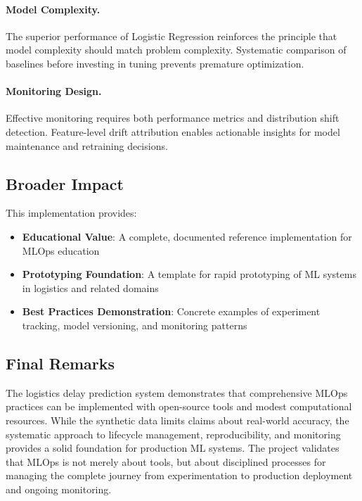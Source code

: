 \documentclass[11pt,a4paper]{article}
\begin{document}
\paragraph{Model Complexity.}
The superior performance of Logistic Regression reinforces the principle that model complexity should match problem complexity. Systematic comparison of baselines before investing in tuning prevents premature optimization.

\paragraph{Monitoring Design.}
Effective monitoring requires both performance metrics and distribution shift detection. Feature-level drift attribution enables actionable insights for model maintenance and retraining decisions.

\subsection{Broader Impact}

This implementation provides:
\begin{itemize}
    \item \textbf{Educational Value}: A complete, documented reference implementation for MLOps education
    \item \textbf{Prototyping Foundation}: A template for rapid prototyping of ML systems in logistics and related domains
    \item \textbf{Best Practices Demonstration}: Concrete examples of experiment tracking, model versioning, and monitoring patterns
\end{itemize}

\subsection{Final Remarks}

The logistics delay prediction system demonstrates that comprehensive MLOps practices can be implemented with open-source tools and modest computational resources. While the synthetic data limits claims about real-world accuracy, the systematic approach to lifecycle management, reproducibility, and monitoring provides a solid foundation for production ML systems. The project validates that MLOps is not merely about tools, but about disciplined processes for managing the complete journey from experimentation to production deployment and ongoing monitoring.
\end{document}
